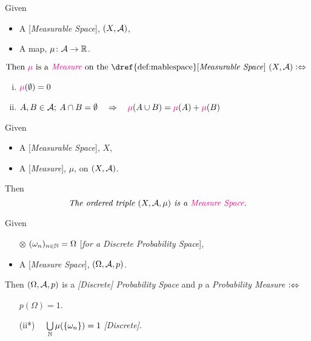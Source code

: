 \begin{definition}[Measures]\label{def:measure}
Given 
\begin{itemize}
\item
	A [\emph{Measurable Space}], $(X, \mathcal{A})$,
\item
	A map, $\mu\colon \mathcal{A} \rightarrow \mathbb{R}$.
\end{itemize}
$\text{Then } {\color{Magenta}\mu} \text{ is a} {\color{Magenta}\emph{ Measure }} \text{on the \dref{def:mablespace}[\emph{Measurable Space}] } (X, \A) \logeq$
\begin{enumerate}[(i)]
\centering
\item
	${\color{Magenta}\mu}(\emptyset) = 0$
\item
	$A, B \in \A; \> A \cap B  = \emptyset \quad \Rightarrow \quad {\color{Magenta}\mu}(A \cup B) = {\color{Magenta}\mu}(A) + {\color{Magenta}\mu}(B)$
\end{enumerate}
\end{definition}

\begin{definition}\label{def:mspace}
Given
\begin{itemize}
\item
	A [\emph{Measurable Space}], $X$,
\item
	A [\emph{Measure}], $\mu$, on $(X, \mathcal{A})$.
\end{itemize}
Then
$$\text{\it The ordered triple }(X, \A, \mu) \text{\it \ is a } {\color{Magenta}\emph{Measure Space}}.$$
\end{definition}


\begin{definition}\label{def:pspace}
Given
\begin{itemize}
\item[\tiny$\otimes$]
	$(\omega_n)_{n \in \mathbb{N}} = \Omega$ [\emph{for a Discrete Probability Space}],
\item
 	A [\emph{Measure Space}], $(\Omega, \mathcal{A}, p)$.
\end{itemize}
Then $(\Omega, \mathcal{A}, p)$ is a {\color{Magenta}\emph{[Discrete] Probability Space}} and {\color{Magenta}$p$} a {\color{Magenta}\emph{Probability Measure}} $\mathrel{\vcentcolon\Leftrightarrow}$
\begin{itemize}
\centering
\item[]
	$p(\Omega) = 1$.
\item[]
	(ii*) \ \ $\bigcup\limits_{\mathbb{N}} \mu(\{\omega_n\}) = 1$ \emph{[Discrete]}.
\end{itemize}
\end{definition}

